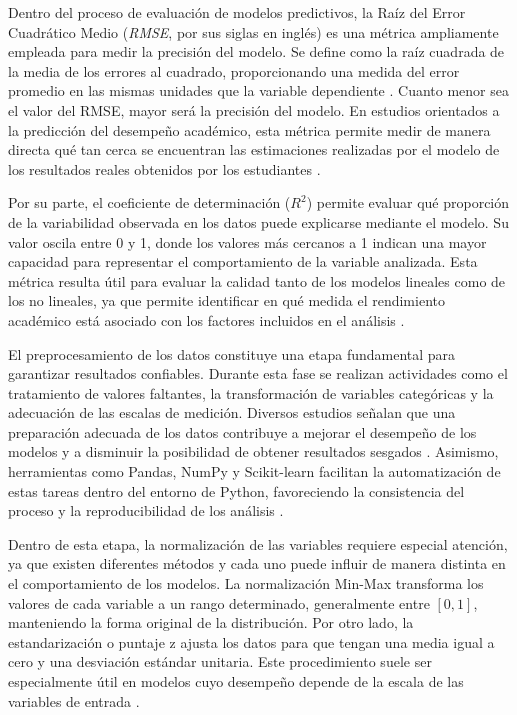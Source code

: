 Dentro del proceso de evaluación de modelos predictivos, la Raíz del Error Cuadrático Medio (\textit{RMSE}, por sus siglas en inglés) es una métrica ampliamente empleada para medir la precisión del modelo. Se define como la raíz cuadrada de la media de los errores al cuadrado, proporcionando una medida del error promedio en las mismas unidades que la variable dependiente \cite{hodson2022rmse}. Cuanto menor sea el valor del RMSE, mayor será la precisión del modelo. En estudios orientados a la predicción del desempeño académico, esta métrica permite medir de manera directa qué tan cerca se encuentran las estimaciones realizadas por el modelo de los resultados reales obtenidos por los estudiantes \cite{hodson2022rmse}. 

Por su parte, el coeficiente de determinación ($R^{2}$) permite evaluar qué proporción de la variabilidad observada en los datos puede explicarse mediante el modelo. Su valor oscila entre 0 y 1, donde los valores más cercanos a 1 indican una mayor capacidad para representar el comportamiento de la variable analizada. Esta métrica resulta útil para evaluar la calidad tanto de los modelos lineales como de los no lineales, ya que permite identificar en qué medida el rendimiento académico está asociado con los factores incluidos en el análisis \cite{chicco2021r2}. 

El preprocesamiento de los datos constituye una etapa fundamental para garantizar resultados confiables. Durante esta fase se realizan actividades como el tratamiento de valores faltantes, la transformación de variables categóricas y la adecuación de las escalas de medición. Diversos estudios señalan que una preparación adecuada de los datos contribuye a mejorar el desempeño de los modelos y a disminuir la posibilidad de obtener resultados sesgados \cite{han2022data}. 
Asimismo, herramientas como Pandas, NumPy y Scikit-learn facilitan la automatización de estas tareas dentro del entorno de Python, favoreciendo la consistencia del proceso y la reproducibilidad de los análisis \cite{han2022data}.

Dentro de esta etapa, la normalización de las variables requiere especial atención, ya que existen diferentes métodos y cada uno puede influir de manera distinta en el comportamiento de los modelos. La normalización Min-Max transforma los valores de cada variable a un rango determinado, generalmente entre $[0, 1]$, manteniendo la forma original de la distribución. Por otro lado, la estandarización o puntaje z ajusta los datos para que tengan una media igual a cero y una desviación estándar unitaria. Este procedimiento suele ser especialmente útil en modelos cuyo desempeño depende de la escala de las variables de entrada \cite{gil2014analisis}.

